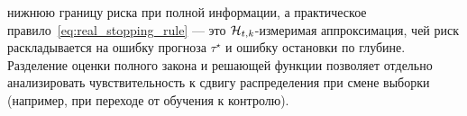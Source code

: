 
нижнюю границу риска при полной информации, а практическое правило~\eqref{eq:real_stopping_rule}
--- это \(\mathcal{H}_{t,k}\)-измеримая аппроксимация, чей риск раскладывается на ошибку прогноза
\(\tau^\star\) и ошибку остановки по глубине. Разделение оценки полного закона и решающей функции
позволяет отдельно анализировать чувствительность к сдвигу распределения при смене выборки
(например, при переходе от обучения к контролю).
